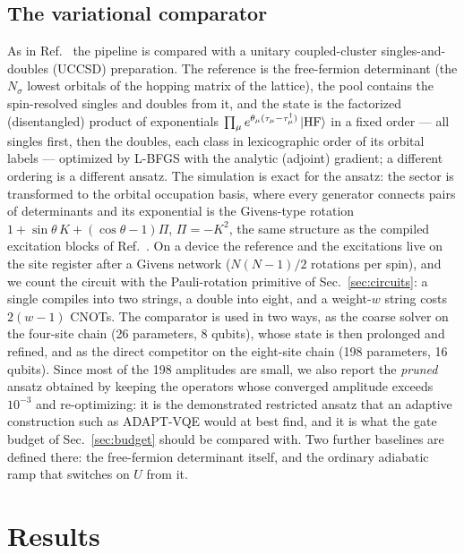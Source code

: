 \documentclass[
  aps,
  prc,
  reprint,
  superscriptaddress,
  floatfix,
  nofootinbib
]{revtex4-2}
\begin{document}
\subsection{The variational comparator}
\label{sec:uccsd}
As in Ref.~\cite{EigenQPairing2026} the pipeline is compared with a unitary
coupled-cluster singles-and-doubles (UCCSD) preparation.  The reference is
the free-fermion determinant (the $N_\sigma$ lowest orbitals of the hopping
matrix of the lattice), the pool contains the spin-resolved singles and
doubles from it, and the state is the factorized (disentangled) product of
exponentials $\prod_\mu e^{\theta_\mu(\tau_\mu-\tau_\mu^\dagger)}\ket{\rm HF}$
in a fixed order --- all singles first, then the doubles, each class in
lexicographic order of its orbital labels --- optimized by L-BFGS with the
analytic (adjoint) gradient; a different ordering is a different ansatz.  The simulation is
exact for the ansatz: the sector is transformed to the orbital occupation
basis, where every generator connects pairs of determinants and its
exponential is the Givens-type rotation
$1+\sin\theta\,K+(\cos\theta-1)\Pi$, $\Pi=-K^2$, the same structure as the
compiled excitation blocks of Ref.~\cite{EigenQPairing2026}.  On a device the
reference and the excitations live on the site register after a Givens
network ($N(N-1)/2$ rotations per spin), and we count the circuit with the
Pauli-rotation primitive of Sec.~\ref{sec:circuits}: a single compiles into
two strings, a double into eight, and a weight-$w$ string costs $2(w-1)$ CNOTs.
The comparator is used in two ways, as the coarse solver on the four-site
chain (26 parameters, 8 qubits), whose state is then prolonged and refined,
and as the direct competitor on the eight-site chain (198 parameters, 16
qubits).  Since most of the 198 amplitudes are small, we also report the
\emph{pruned} ansatz obtained by keeping the operators whose converged
amplitude exceeds $10^{-3}$ and re-optimizing: it is the demonstrated
restricted ansatz that an adaptive construction such as ADAPT-VQE would at
best find, and it is what the gate budget of Sec.~\ref{sec:budget} should be
compared with.  Two further baselines are defined there: the free-fermion
determinant itself, and the ordinary adiabatic ramp that switches on $U$
from it.

\section{Results}
\label{sec:results}
\end{document}

